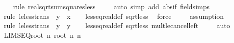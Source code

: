 \begin{isabellebody}
%
\isadelimproof
\ \ %
\endisadelimproof
%
\isatagproof
{}\isamarkupfalse%
\ {\isacharparenleft}{\kern0pt}rule\ real{\isacharunderscore}{\kern0pt}sqrt{\isacharunderscore}{\kern0pt}sum{\isacharunderscore}{\kern0pt}squares{\isacharunderscore}{\kern0pt}less{\isacharparenright}{\kern0pt}\isanewline
\ \ \ \isamarkupfalse%
\ {\isacharparenleft}{\kern0pt}auto\ simp\ add{\isacharcolon}{\kern0pt}\ abs{\isacharunderscore}{\kern0pt}if\ field{\isacharunderscore}{\kern0pt}simps{\isacharparenright}{\kern0pt}\isanewline
\ \ \ \isamarkupfalse%
\ {\isacharparenleft}{\kern0pt}rule\ le{\isacharunderscore}{\kern0pt}less{\isacharunderscore}{\kern0pt}trans\ {\isacharbrackleft}{\kern0pt}\ y\ {\isacharequal}{\kern0pt}\ {\isachardoublequoteopen}x{\isacharasterisk}{\kern0pt}{}{\isachardoublequoteclose}{\isacharbrackright}{\kern0pt}{\isacharparenright}{\kern0pt}\isanewline
\ \ \isamarkupfalse%
\ less{\isacharunderscore}{\kern0pt}eq{\isacharunderscore}{\kern0pt}real{\isacharunderscore}{\kern0pt}def\ sqrt{}{\isacharunderscore}{\kern0pt}less{\isacharunderscore}{\kern0pt}{}\ \isamarkupfalse%
\ force\isanewline
\ \ \ \isamarkupfalse%
\ assumption\isanewline
\ \ \isamarkupfalse%
\ {\isacharparenleft}{\kern0pt}rule\ le{\isacharunderscore}{\kern0pt}less{\isacharunderscore}{\kern0pt}trans\ {\isacharbrackleft}{\kern0pt}\ y\ {\isacharequal}{\kern0pt}\ {\isachardoublequoteopen}y{\isacharasterisk}{\kern0pt}{}{\isachardoublequoteclose}{\isacharbrackright}{\kern0pt}{\isacharparenright}{\kern0pt}\isanewline
\ \ \isamarkupfalse%
\ less{\isacharunderscore}{\kern0pt}eq{\isacharunderscore}{\kern0pt}real{\isacharunderscore}{\kern0pt}def\ sqrt{}{\isacharunderscore}{\kern0pt}less{\isacharunderscore}{\kern0pt}{}\ mult{\isacharunderscore}{\kern0pt}le{\isacharunderscore}{\kern0pt}cancel{\isacharunderscore}{\kern0pt}left\isanewline
\ \ \ \isamarkupfalse%
\ auto\isanewline
\ \ \isamarkupfalse%
%
\endisatagproof
{\isafoldproof}%
%
\isadelimproof
\isanewline
%
\endisadelimproof
\isanewline
{}\isamarkupfalse%
\ LIMSEQ{\isacharunderscore}{\kern0pt}root{\isacharcolon}{\kern0pt}\ {\isachardoublequoteopen}{\isacharparenleft}{\kern0pt}{\isasymlambda}n{\isachardot}{\kern0pt}\ root\ n\ n{\isacharparenright}{\kern0pt}\ {\isasymlonglonglongrightarrow}\ {}{\isachardoublequoteclose}\isanewline
%
\isadelimproof
%
\endisadelimproof

\end{isabellebody}
